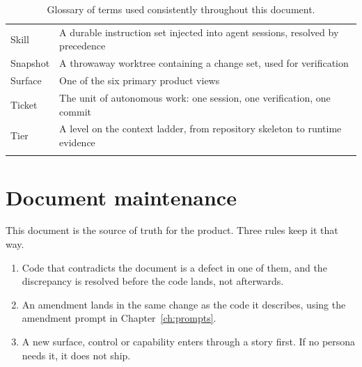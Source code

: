 \begin{longtable}{@{}p{} p{}@{}}
Skill & A durable instruction set injected into agent sessions, resolved by precedence \\
Snapshot & A throwaway worktree containing a change set, used for verification \\
Surface & One of the six primary product views \\
Ticket & The unit of autonomous work: one session, one verification, one commit \\
Tier & A level on the context ladder, from repository skeleton to runtime evidence \\
\bottomrule
\caption{Glossary of terms used consistently throughout this document.}
\end{longtable}

\section{Document maintenance}

This document is the source of truth for the product. Three rules keep it that way.

\begin{enumerate}
  \item Code that contradicts the document is a defect in one of them, and the discrepancy
  is resolved before the code lands, not afterwards.
  \item An amendment lands in the same change as the code it describes, using the amendment
  prompt in Chapter~\ref{ch:prompts}.
  \item A new surface, control or capability enters through a story first. If no persona
  needs it, it does not ship.
\end{enumerate}
